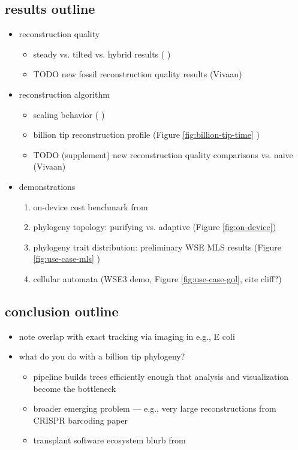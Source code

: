 \subsection{results outline}

\begin{itemize}
\item reconstruction quality
   \begin{itemize}
   \item steady vs. tilted vs. hybrid results ( \citep{moreno2025testing})
   \item TODO new fossil reconstruction quality results (Vivaan)
   \end{itemize}
\item reconstruction algorithm
   \begin{itemize}
  \item scaling behavior ( \citep{singhvi2025scalable})
   \item billion tip reconstruction profile (Figure \ref{fig:billion-tip-time} \citep{singhvi2025scalable})
   \item TODO (supplement) new reconstruction quality comparisons vs. naive (Vivaan)
   \end{itemize}
\item demonstrations
  \begin{enumerate}
  \item on-device cost benchmark from \citep{moreno2024trackable}
  \item phylogeny topology: purifying vs. adaptive (Figure \ref{fig:on-device}) \citep{moreno2024trackable}
  \item phylogeny trait distribution: preliminary WSE MLS results (Figure \ref{fig:use-case-mls} \citep{moreno2025extending})
  \item cellular automata (WSE3 demo, Figure \ref{fig:use-case-gol}, cite cliff?)
  \end{enumerate}
\end{itemize}

\subsection{conclusion outline}

\begin{itemize}
\item note overlap with exact tracking via imaging in e.g., E coli
\item what do you do with a billion tip phylogeny?
   \begin{itemize}
   \item pipeline builds trees efficiently enough that analysis and visualization become the bottleneck
   \item broader emerging problem --- e.g., very large reconstructions from CRISPR barcoding paper
   \item transplant software ecosystem blurb from \citep{singhvi2025scalable}
   \end{itemize}
\end{itemize}

